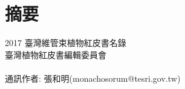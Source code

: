 \thispagestyle{plain}
\chapter*{\hspace{13.5em}摘\hspace{2em}要\hspace{10em}}
\linespread{1.5}\selectfont

\huge 2017 臺灣維管束植物紅皮書名錄 \\
\noindent \Large 臺灣植物紅皮書編輯委員會
\hspace{2em}\\
\\
\normalsize
\noindent 通訊作者: 張和明(monachosorum@tesri.gov.tw) \\
\\

